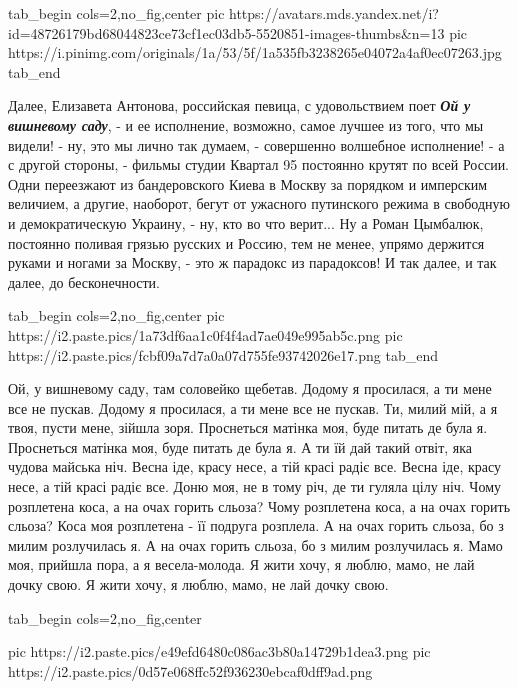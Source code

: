 \ifcmt
  tab_begin cols=2,no_fig,center
     pic https://avatars.mds.yandex.net/i?id=48726179bd68044823ce73cf1ec03db5-5520851-images-thumbs&n=13
     pic https://i.pinimg.com/originals/1a/53/5f/1a535fb3238265e04072a4af0ec07263.jpg
  tab_end
\fi

Далее, Елизавета Антонова, российская певица, с удовольствием поет
\textbf{\emph{Ой у вишневому саду}}, - и ее исполнение, возможно, самое лучшее
из того, что мы видели! - ну, это мы лично так думаем, - совершенно волшебное
исполнение! - а с другой стороны, - фильмы студии Квартал 95 постоянно крутят
по всей России.  Одни переезжают из бандеровского Киева в Москву за порядком и
имперским величием, а другие, наоборот, бегут от ужасного путинского режима в
свободную и демократическую Украину, - ну, кто во что верит... Ну а Роман
Цымбалюк, постоянно поливая грязью русских и Россию, тем не менее, упрямо
держится руками и ногами за Москву, - это ж парадокс из парадоксов! И так
далее, и так далее, до бесконечности.

\ifcmt
  tab_begin cols=2,no_fig,center
     pic https://i2.paste.pics/1a73df6aa1c0f4f4ad7ae049e995ab5c.png
     pic https://i2.paste.pics/fcbf09a7d7a0a07d755fe93742026e17.png
  tab_end
\fi

\raggedcolumns
\begin{multicols}{2} %
\setlength{\parindent}{0pt}
\obeycr
Ой, у вишневому саду, там соловейко щебетав.
Додому я просилася, а ти мене все не пускав.
Додому я просилася, а ти мене все не пускав.
\smallskip
Ти, милий мій, а я твоя, пусти мене, зійшла зоря.
Проснеться матінка моя, буде питать де була я.
Проснеться матінка моя, буде питать де була я.
\smallskip
А ти їй дай такий отвіт, яка чудова майська ніч.
Весна іде, красу несе, а тій красі радіє все.
Весна іде, красу несе, а тій красі радіє все.
\smallskip
Доню моя, не в тому річ, де ти гуляла цілу ніч.
Чому розплетена коса, а на очах горить сльоза?
Чому розплетена коса, а на очах горить сльоза?
\smallskip
Коса моя розплетена - її подруга розплела.
А на очах горить сльоза, бо з милим розлучилась я.
А на очах горить сльоза, бо з милим розлучилась я.
\smallskip
Мамо моя, прийшла пора, а я весела-молода.
Я жити хочу, я люблю, мамо, не лай дочку свою.
Я жити хочу, я люблю, мамо, не лай дочку свою.
\restorecr
\end{multicols} %

\ifcmt
  tab_begin cols=2,no_fig,center

     pic https://i2.paste.pics/e49efd6480c086ac3b80a14729b1dea3.png
     pic https://i2.paste.pics/0d57e068ffc52f936230ebcaf0dff9ad.png

